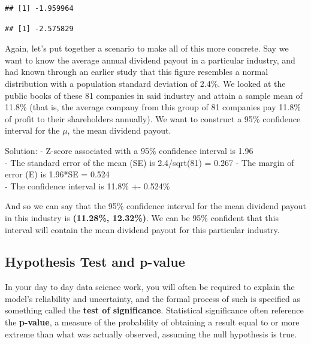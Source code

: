 \documentclass[]{article}
\newenvironment{Shaded}{\begin{snugshade}}{\end{snugshade}}
\newcommand{\CommentTok}[1]{\textcolor[rgb]{0.56,0.35,0.01}{\textit{#1}}}
\newcommand{\FloatTok}[1]{\textcolor[rgb]{0.00,0.00,0.81}{#1}}
\newcommand{\KeywordTok}[1]{\textcolor[rgb]{0.13,0.29,0.53}{\textbf{#1}}}
\newcommand{\NormalTok}[1]{#1}
\begin{document}
\begin{verbatim}
## [1] -1.959964
\end{verbatim}

\begin{Shaded}
\end{Shaded}

\begin{verbatim}
## [1] -2.575829
\end{verbatim}

Again, let's put together a scenario to make all of this more concrete.
Say we want to know the average annual dividend payout in a particular
industry, and had known through an earlier study that this figure
resembles a normal distribution with a population standard deviation of
2.4\%. We looked at the public books of these 81 companies in said
industry and attain a sample mean of 11.8\% (that is, the average
company from this group of 81 companies pay 11.8\% of profit to their
shareholders annually). We want to construct a 95\% confidence interval
for the \(\mu\), the mean dividend payout.

Solution: - Z-score associated with a 95\% confidence interval is 1.96\\
- The standard error of the mean (SE) is 2.4/sqrt(81) = 0.267 - The
margin of error (E) is 1.96*SE = 0.524\\
- The confidence interval is 11.8\% +- 0.524\%

And so we can say that the 95\% confidence interval for the mean
dividend payout in this industry is \textbf{(11.28\%, 12.32\%)}. We can
be 95\% confident that this interval will contain the mean dividend
payout for this particular industry.

\hypertarget{hypothesis-test-and-p-value}{%
\subsection{Hypothesis Test and
p-value}\label{hypothesis-test-and-p-value}}

In your day to day data science work, you will often be required to
explain the model's reliability and uncertainty, and the formal process
of such is specified as something called the \textbf{test of
significance}. Statistical significance often reference the
\textbf{p-value}, a measure of the probability of obtaining a result
equal to or more extreme than what was actually observed, assuming the
null hypothesis is true.
\end{document}
